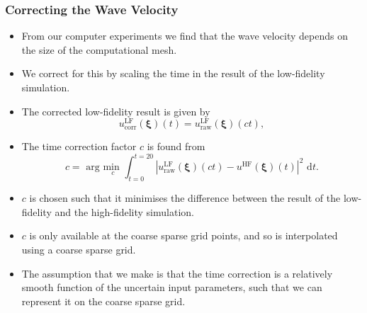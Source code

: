 \documentclass[11pt,ucs]{beamer}
\begin{document}
\begin{frame}\frametitle{Correcting the Wave Velocity}

\begin{itemize}
\item From our computer experiments we find that the wave velocity depends on the size of the computational mesh. 

\item We correct for this by scaling the time in the result of the low-fidelity simulation. 

\item The corrected low-fidelity result is given by
%
\begin{equation}
u_{\text{corr}}^\text{LF}(\boldsymbol{\xi})(t) = u_{\text{raw}}^\text{LF}(\boldsymbol{\xi})(c t),
\end{equation}
%

\item The time correction factor $c$ is found from
%
\begin{equation}
c = \text{ arg } \underset{c}{\text{min }}  \int_{t=0}^{t=20}| u_{\text{raw}}^\text{LF}(\boldsymbol{\xi})(c t) - u^\text{HF}(\boldsymbol{\xi})(t)|^2 \text{ d}t.
\end{equation}
%

\item $c$ is chosen such that it minimises the difference between the result of the low-fidelity and the high-fidelity simulation. 

\item $c$ is only available at the coarse sparse grid points, and so is interpolated using a coarse sparse grid. 

\item The assumption that we make is that the time correction is a relatively smooth function of the uncertain input parameters, such that we can represent it on the coarse sparse grid.


\end{itemize}

\end{frame}
\end{document}

